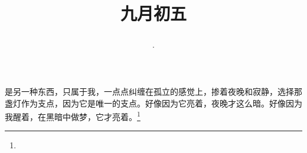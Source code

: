 \title{\date[d=7,m=10,y=2024][year:cn-y,年,month:cn,day:cn,日,·,weekday]·九月初五 }
是另一种东西，只属于我，一点点纠缠在孤立的感觉上，掺着夜晚和寂静，选择那盏灯作为支点，因为它是唯一的支点。好像因为它亮着，夜晚才这么暗。好像因为我醒着，在黑暗中做梦，它才亮着。\footnote{ }

